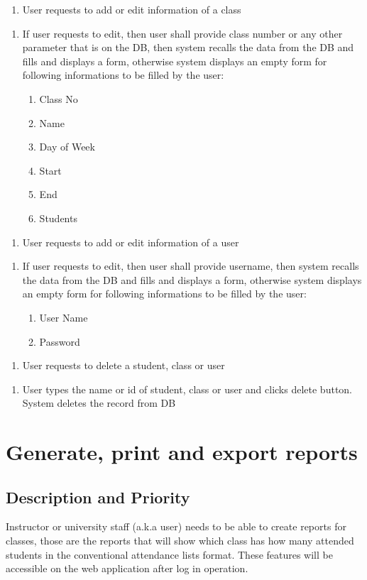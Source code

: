 \documentclass{scrreprt}
\newcommand{\stimulus}[1] {
  \begin{enumerate}[leftmargin=5.7\parindent, label=Stimulus:]
  \item #1
  \end{enumerate}
  
  }
\newcommand{\response}[1] {
  \smallskip
  \begin{enumerate}[leftmargin=6\parindent, label=Response:]
  \item #1
  \end{enumerate}
  }
\begin{document}
\vspace{5mm}
\stimulus{User requests to add or edit information of a class}

\response{  If user requests to edit, then user shall provide class number or any other parameter that is on the DB, then system recalls the data from the DB and fills and displays a form, otherwise system displays an empty form for following informations to be filled by the user: 
\begin{enumerate}[leftmargin=10\parindent, label=\arabic*.]
  \item Class No
  \item Name
  \item Day of Week
  \item Start
  \item End
  \item Students
\end{enumerate}
}



\vspace{5mm}
\stimulus{User requests to add or edit information of a user}

\response{ If user requests to edit, then user shall provide username, then system recalls the data from the DB and fills and displays a form, otherwise system displays an empty form for following informations to be filled by the user: 
\begin{enumerate}[leftmargin=10\parindent, label=\arabic*.]
  \item User Name
  \item Password
\end{enumerate}
}

\vspace{5mm}
\stimulus{User requests to delete a student, class or user}

\response{  User types the name or id of student, class or user and clicks delete button. System deletes the record from DB}

\section{Generate, print and export reports}

\subsection{Description and Priority}
Instructor or university staff (a.k.a user) needs to be able to create reports for classes, those are the reports that will show which class has how many attended students in the conventional attendance lists format. These features will be accessible on the web application after log in operation.
\end{document}
